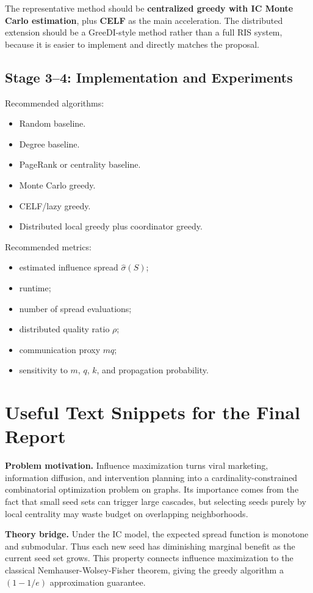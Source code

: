 \documentclass[10pt]{article}
\begin{document}
The representative method should be \textbf{centralized greedy with IC Monte
Carlo estimation}, plus \textbf{CELF} as the main acceleration. The distributed
extension should be a GreeDI-style method rather than a full RIS system, because
it is easier to implement and directly matches the proposal.

\subsection{Stage 3--4: Implementation and Experiments}

Recommended algorithms:
\begin{itemize}
\item Random baseline.
\item Degree baseline.
\item PageRank or centrality baseline.
\item Monte Carlo greedy.
\item CELF/lazy greedy.
\item Distributed local greedy plus coordinator greedy.
\end{itemize}

Recommended metrics:
\begin{itemize}
\item estimated influence spread $\widehat{\sigma}(S)$;
\item runtime;
\item number of spread evaluations;
\item distributed quality ratio $\rho$;
\item communication proxy $mq$;
\item sensitivity to $m$, $q$, $k$, and propagation probability.
\end{itemize}

\section{Useful Text Snippets for the Final Report}

\textbf{Problem motivation.} Influence maximization turns viral marketing,
information diffusion, and intervention planning into a cardinality-constrained
combinatorial optimization problem on graphs. Its importance comes from the
fact that small seed sets can trigger large cascades, but selecting seeds
purely by local centrality may waste budget on overlapping neighborhoods.

\textbf{Theory bridge.} Under the IC model, the expected spread function is
monotone and submodular. Thus each new seed has diminishing marginal benefit as
the current seed set grows. This property connects influence maximization to
the classical Nemhauser-Wolsey-Fisher theorem, giving the greedy algorithm a
$(1-1/e)$ approximation guarantee.
\end{document}
